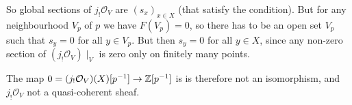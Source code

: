 \begin{exercise}{3}
\begin{enumerate}
{                So global sections of $j_! \mathcal{O}_V$ are $(s_x)_{x \in X}$
                (that satisfy the condition). But for any neighbourhood $V_p$ of
                $p$ we have $F(V_p) = 0$, so there has to be an open set $V_p$
                such that $s_y = 0$ for all $y \in V_p$. But then $s_y = 0$ for
                all $y \in X$, since any non-zero section of $(j_!
                \mathcal{O}_V) \mid_V$ is zero only on finitely many points.
                
                The map $0 = (j_! \mathcal{O}_V)(X)[p^{-1}] \to \mathbb{Z}[p^{-1}]$ is
                is therefore not an isomorphism, and $j_! \mathcal{O}_V$ not a
                quasi-coherent sheaf.
            }
    \end{enumerate}
\end{exercise}


